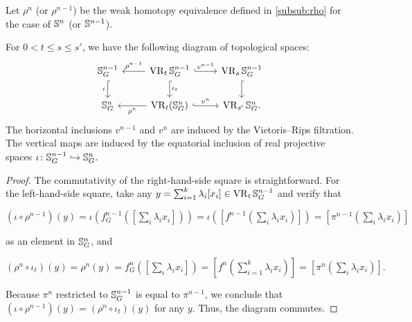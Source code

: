 Let $\rho^n$ (or $\rho^{n-1}$) be the weak homotopy equivalence defined in \cref{subsub:rho} for the case of $\mathbb{S}^n$ (or $\mathbb{S}^{n-1}$).

\medskip\lemma
For $0<t\leq s \leq s'$, we have the following diagram of topological spaces:
\begin{equation}\label{d:fundamental_bars_diagram}
	\begin{tikzcd}
		\bS^{n-1}_G
		\ar[d, hook,"{\iota}" left]
		&
		\VR_t\bS^{n-1}_G
		\ar[d, hook,"\iota_t"]
		\ar[l, "\rho^{n-1}" above]
		\ar[r, hook, "v^{n-1}"]
		&
		\VR_{s}\bS^{n-1}_G
		\ar[d, hook]
		\\
		\bS^{n}_G
		&
		\VR_t(\bS^{n}_G)
		\ar[l, "\rho^n" below]
		\ar[r, hook, "v^{n}"]
		&
		\VR_{s'}\bS^{n}_G.
	\end{tikzcd}
\end{equation}
The horizontal inclusions $v^{n-1}$ and $v^n$ are induced by the Vietoris--Rips filtration.
The vertical maps are induced by the equatorial inclusion of real projective spaces $\iota \colon \mathbb{S}^{n-1}_G \hookrightarrow \mathbb{S}^{n}_G$.

\begin{proof}
	The commutativity of the right-hand-side square is straightforward.
	For the left-hand-side square, take any $y = \sum_{i=1}^k \lambda_i [x_i] \in \operatorname{VR}_t\mathbb{S}^{n-1}_G$ and verify that
	\begin{center}
		$(\iota \circ \rho^{n-1})(y)
		=\iota(f^{n-1}_G([\sum_i \lambda_i x_i]))
		=\iota([f^{n-1}(\sum_i \lambda_i x_i)])
		=[\pi^{n-1}(\sum_i \lambda_i x_i)]
		$
	\end{center}
	as an element in $\mathbb{S}^n_G$, and
	\begin{center}
		$(\rho^{n} \circ \iota_t)(y) = \rho^{n}(y) = f^{n}_G([\sum_i \lambda_i x_i]) = [f^{n}(\sum_{i=1}^k \lambda_i x_i)] = [\pi^{n}(\sum_i \lambda_i x_i)].
		$
	\end{center}
	Because $\pi^{n}$ restricted to $\mathbb{S}^{n-1}_G$ is equal to $\pi^{n-1}$, we conclude that $(\iota \circ \rho^{n-1})(y) = (\rho^n \circ \iota_t)(y)$ for any $y$.
	Thus, the diagram commutes.
\end{proof}

\subsubsection{}
\label{subsub:foundamental_bar_rpn_lemma}


